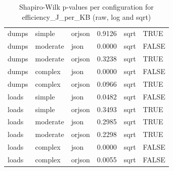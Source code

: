 \begin{table}[ht]
\begin{tabular}{lllrll}
  dumps & simple & orjson & 0.9126 & sqrt & TRUE \\ 
  dumps & moderate & json & 0.0000 & sqrt & FALSE \\ 
  dumps & moderate & orjson & 0.3238 & sqrt & TRUE \\ 
  dumps & complex & json & 0.0000 & sqrt & FALSE \\ 
  dumps & complex & orjson & 0.0966 & sqrt & TRUE \\ 
  loads & simple & json & 0.0482 & sqrt & FALSE \\ 
  loads & simple & orjson & 0.3493 & sqrt & TRUE \\ 
  loads & moderate & json & 0.2985 & sqrt & TRUE \\ 
  loads & moderate & orjson & 0.2298 & sqrt & TRUE \\ 
  loads & complex & json & 0.0000 & sqrt & FALSE \\ 
  loads & complex & orjson & 0.0055 & sqrt & FALSE \\ 
   \bottomrule
\end{tabular}
\caption{Shapiro-Wilk p-values per configuration for efficiency_J_per_KB (raw, log and sqrt)} 
\label{tab:normality_RQ1_1_efficiency}
\end{table}
